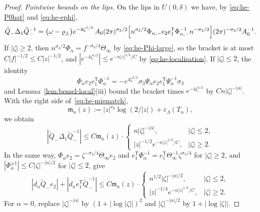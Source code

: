 \begin{proof}
\emph{Pointwise bounds on the lips.} On the lips in $U(0,\delta)$ we have, by \eqref{eq:he-P0hat} and \eqref{eq:he-ephi},
\[
  \tilde Q_-\Delta_1\tilde Q_-^{-1}=\bigl(\omega-\varrho_\pm\bigr)e^{-4\zeta^{1/2}}\,A_0(2\pi)^{\sigma_3/2}
  \Bigl[n^{\sigma_3/2}\Phi_{\alpha,-}e_2e_1^{\mathsf T}\Phi_{\alpha,-}^{-1}n^{-\sigma_3/2}\Bigr](2\pi)^{-\sigma_3/2}A_0^{-1}.
\]
If $|\zeta|\ge2$, then $n^{\sigma_3/2}\Phi_\alpha=f^{-\sigma_3/4}\Theta_\infty$ by \eqref{eq:he-Phi-large}, so the bracket
is at most $C|f|^{-1/2}\le C|z|^{-1/2}$, and $|e^{-4\zeta^{1/2}}|\le e^{-n|z|^{1/2}/C}$ by \eqref{eq:he-localisation}. If
$|\zeta|\le2$, the identity
\[
  \Phi_\alpha e_2e_1^{\mathsf T}\Phi_\alpha^{-1}=-e^{4\zeta^{1/2}}\sigma_3\Psi_\alpha e_2e_1^{\mathsf T}\Psi_\alpha^{-1}\sigma_3
\]
and Lemma~\ref{lem:bessel-local}(iii) bound the bracket times $e^{-4\zeta^{1/2}}$ by
$Cn|\zeta|^{-|\alpha|}$. With the right side of~\eqref{eq:he-mismatch},
\[
  \mathfrak m_n(z):=|z|^{\nu_p}\log(2/|z|)+\varepsilon_\Lambda(T_n),
\]
we obtain
\begin{equation}\label{eq:he-main-bound}
  |\tilde Q_-\Delta_1\tilde Q_-^{-1}|\le C\mathfrak m_n(z)\cdot\begin{cases}n|\zeta|^{-|\alpha|},&|\zeta|\le2,\\
  |z|^{-1/2}e^{-n|z|^{1/2}/C},&|\zeta|\ge2.\end{cases}
\end{equation}
In the same way, $\Phi_\alpha e_2=\zeta^{-\sigma_3/4}\Theta_\infty e_2$ and $e_1^{\mathsf T}\Phi_\alpha^{-1}=e_1^{\mathsf T}
\Theta_\infty^{-1}\zeta^{\sigma_3/4}$ for $|\zeta|\ge2$, and $|\Phi_\alpha^{\pm1}|\le C|\zeta|^{-|\alpha|/2}$ for
$|\zeta|\le2$, give
\begin{equation}\label{eq:he-column-bound}
  |d_n\tilde Q_-e_2|+|d_ne_1^{\mathsf T}\tilde Q_-^{-1}|\le C\mathfrak m_n(z)\cdot\begin{cases}n^{1/2}|\zeta|^{-|\alpha|/2},&|\zeta|\le2,\\
  |z|^{-1/4}e^{-n|z|^{1/2}/C},&|\zeta|\ge2.\end{cases}
\end{equation}
For $\alpha=0$, replace $|\zeta|^{-|\alpha|}$ by $(1+|\log|\zeta||)^2$ and $|\zeta|^{-|\alpha|/2}$ by
$1+|\log|\zeta||$.


\end{proof}
